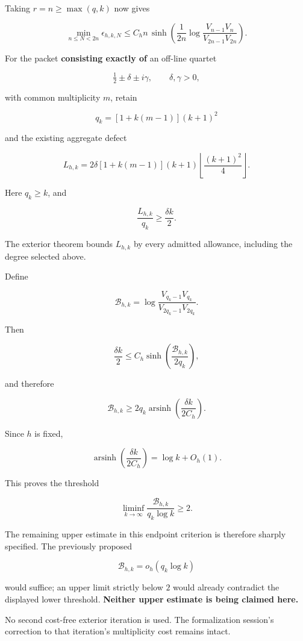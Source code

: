 Taking \(r=n\ge\max(q,k)\) now gives

\[
\boxed{
\min_{n\le N<2n}\epsilon_{h,k,N}
\le
C_hn\,
\sinh\!\left(
\frac1{2n}
\log\frac{V_{n-1}V_n}{V_{2n-1}V_{2n}}
\right).
}
\]

For the packet \textbf{consisting exactly of} an off-line quartet

\[
\tfrac12\pm\delta\pm i\gamma,
\qquad \delta,\gamma>0,
\]

with common multiplicity \(m\), retain

\[
q_k=[1+k(m-1)](k+1)^2
\]

and the existing aggregate defect

\[
L_{h,k}
=
2\delta[1+k(m-1)](k+1)
\left\lfloor\frac{(k+1)^2}{4}\right\rfloor.
\]

Here \(q_k\ge k\), and

\[
\frac{L_{h,k}}{q_k}\ge\frac{\delta k}{2}.
\]

The exterior theorem bounds \(L_{h,k}\) by every admitted allowance, including the degree selected above.

Define

\[
\mathcal B_{h,k}
=
\log\frac{V_{q_k-1}V_{q_k}}{V_{2q_k-1}V_{2q_k}}.
\]

Then

\[
\boxed{
\frac{\delta k}{2}
\le
C_h\sinh\!\left(\frac{\mathcal B_{h,k}}{2q_k}\right),
}
\]

and therefore

\[
\boxed{
\mathcal B_{h,k}
\ge
2q_k\operatorname{arsinh}\!\left(\frac{\delta k}{2C_h}\right).
}
\]

Since \(h\) is fixed,

\[
\operatorname{arsinh}\!\left(\frac{\delta k}{2C_h}\right)
=
\log k+O_h(1).
\]

This proves the threshold

\[
\boxed{
\liminf_{k\to\infty}
\frac{\mathcal B_{h,k}}{q_k\log k}\ge2.
}
\]

The remaining upper estimate in this endpoint criterion is therefore sharply specified. The previously proposed

\[
\mathcal B_{h,k}=o_h(q_k\log k)
\]

would suffice; an upper limit strictly below \(2\) would already contradict the displayed lower threshold. \textbf{Neither upper estimate is being claimed here.}

No second cost-free exterior iteration is used. The formalization session's correction to that iteration's multiplicity cost remains intact.

